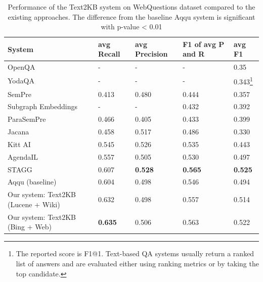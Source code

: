 \begin{table}
\caption{Performance of the Text2KB system on WebQuestions dataset compared to the existing approaches. The difference from the baseline Aqqu system is significant with p-value < 0.01}
\label{table:webquestions_results}
\begin{minipage}{17cm}
\centering
\begin{tabular}{| p{6cm} | p{1.5cm} | p{1.5cm} | p{1.5cm} | p{1.5cm} | }
\hline
System & avg Recall & avg Precision & F1 of avg P and R & avg F1 \\
\hline
OpenQA \cite{Fader:2014:OQA:2623330.2623677} & - & - & - & 0.35 \\
YodaQA \cite{baudivs2015systems} & - & - & - & 0.343\footnote{The reported score is F1@1. Text-based QA systems usually return a ranked list of answers and are evaluated either using ranking metrics or by taking the top candidate.} \\
\hline
SemPre \cite{Berant:EMNLP13} & 0.413 & 0.480 & 0.444 & 0.357\\
Subgraph Embeddings \cite{BordesCW14:emnlp} & - & - & 0.432 & 0.392\\
ParaSemPre \cite{berant2014semantic} & 0.466 & 0.405 & 0.433 & 0.399\\
Jacana \cite{yao2014information} & 0.458 & 0.517 & 0.486 & 0.330\\
Kitt AI \cite{yao-scratch-qa-naacl2015} & 0.545 & 0.526 & 0.535 & 0.443\\
AgendaIL \cite{berant2015imitation} & 0.557 & 0.505 & 0.530 & 0.497\\
STAGG \cite{yih2015semantic} & 0.607 & \textbf{0.528} & \textbf{0.565} & \textbf{0.525}\\
\hline
Aqqu (baseline) \cite{ACCU:2015} & 0.604 & 0.498 & 0.546 & 0.494\\
Our system: Text2KB (Lucene + Wiki) & 0.632 & 0.498 & 0.557 & 0.514 \\
Our system: Text2KB (Bing + Web) & \textbf{0.635} & 0.506 & 0.563 & 0.522 \\
\hline
\end{tabular}
\end{minipage}
\vspace{-0.7cm}
\end{table}

